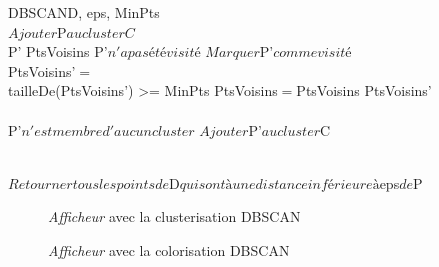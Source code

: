 \documentclass[12pt]{report}
\begin{document}
\begin{spacing}{1.2}
\begin{pseudocode}{DBSCAN}{D, eps, MinPts}
\\
	$Ajouter $P$ au cluster C$\\
	\FOREACH P' \in PtsVoisins \DO
			\IF P'$ n'a pas été visité$
			\THEN 
				\BEGIN
					$Marquer $P'$ comme visité$\\
					PtsVoisins'$ = $ \\
					\IF tailleDe(PtsVoisins') >= MinPts
					\THEN PtsVoisins$ = $PtsVoisins \cup PtsVoisins'\\
				\END\\
			\IF P'$ n'est membre d'aucun cluster$
			\THEN $Ajouter $P'$ au cluster $C
\ENDPROCEDURE

\\
	$Retourner tous les points de $D$ qui sont à une distance inférieure à $eps$ de $P
\ENDPROCEDURE
\end{pseudocode}

\begin{figure}[h]
\begin{center}
\end{center}
\caption{\textit{Afficheur} avec la clusterisation DBSCAN}
\end{figure}

\begin{figure}[h]
\begin{center}
\end{center}
\caption{\textit{Afficheur} avec la colorisation DBSCAN}
\end{figure}


\end{spacing}
\end{document}
